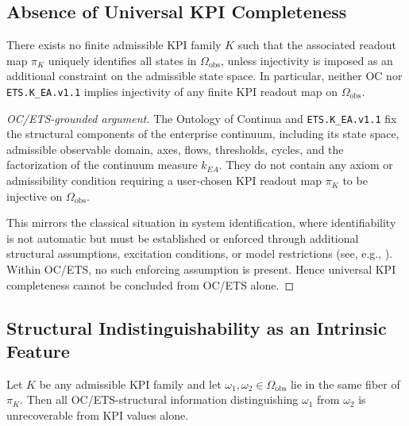 \subsection{Absence of Universal KPI Completeness}

\begin{theorem}
\label{thm:no-complete}
There exists no finite admissible KPI family \(K\) such that the associated
readout map \(\pi_K\) uniquely identifies all states in
\(\Omega_{\mathrm{obs}}\), unless injectivity is imposed as an additional
constraint on the admissible state space.
In particular, neither OC nor \texttt{ETS.K\_EA.v1.1} implies injectivity of any
finite KPI readout map on \(\Omega_{\mathrm{obs}}\).
\end{theorem}

\begin{proof}[OC/ETS-grounded argument]
The Ontology of Continua and \texttt{ETS.K\_EA.v1.1} fix the structural components
of the enterprise continuum, including its state space, admissible observable
domain, axes, flows, thresholds, cycles, and the factorization of the continuum
measure \(k_{EA}\).
They do not contain any axiom or admissibility condition requiring a user-chosen
KPI readout map \(\pi_K\) to be injective on \(\Omega_{\mathrm{obs}}\).

This mirrors the classical situation in system identification, where
identifiability is not automatic but must be established or enforced through
additional structural assumptions, excitation conditions, or model
restrictions (see, e.g., \cite{ljung1999,walter1997}).
Within OC/ETS, no such enforcing assumption is present.
Hence universal KPI completeness cannot be concluded from OC/ETS alone.
\end{proof}

\subsection{Structural Indistinguishability as an Intrinsic Feature}

\begin{proposition}
\label{prop:fiber-loss}
Let \(K\) be any admissible KPI family and let
\(\omega_1,\omega_2\in\Omega_{\mathrm{obs}}\) lie in the same fiber of
\(\pi_K\).
Then all OC/ETS-structural information distinguishing \(\omega_1\) from
\(\omega_2\) is unrecoverable from KPI values alone.
\end{proposition}

